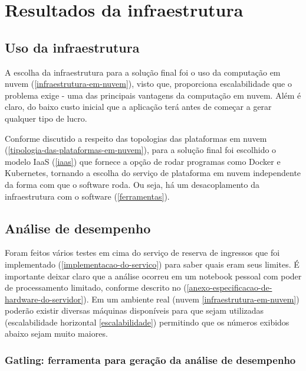 \chapter{Resultados da infraestrutura}

\section{Uso da infraestrutura}

A escolha da infraestrutura para a solução final foi o uso da
computação em nuvem (\autoref{infraestrutura-em-nuvem}), visto que, proporciona
escalabilidade que o problema exige - uma das principais vantagens da computação em nuvem.
Além é claro, do baixo custo inicial que a aplicação terá antes de começar a gerar qualquer
tipo de lucro.

Conforme discutido a respeito das topologias das plataformas em
nuvem (\autoref{tipologia-das-plataformas-em-nuvem}), para a solução final foi escolhido o
modelo IaaS (\autoref{iaas}) que fornece a opção de rodar programas como Docker e
Kubernetes, tornando a escolha do serviço de plataforma em nuvem independente da forma
com que o software roda. Ou seja, há um desacoplamento da infraestrutura com o software
(\autoref{ferramentas}).

\section{Análise de desempenho}

Foram feitos vários testes em cima do serviço de reserva de ingressos que foi implementado
(\autoref{implementacao-do-servico}) para saber quais eram seus limites.
É importante deixar claro que a análise ocorreu em um notebook pessoal com poder
de processamento limitado, conforme descrito no
(\autoref{anexo-especificacao-de-hardware-do-servidor}).
Em um ambiente real (nuvem \autoref{infraestrutura-em-nuvem})
poderão existir diversas máquinas disponíveis para que sejam utilizadas
(escalabilidade horizontal \autoref{escalabilidade})
permitindo que os números exibidos abaixo sejam muito maiores.

\subsection{Gatling: ferramenta para geração da análise de desempenho}


